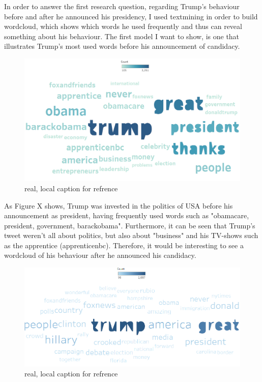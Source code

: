 \documentclass{article}
\begin{document}
In order to answer the first research question, regarding Trump's behaviour before and after he announced his presidency, I used textmining in order to build wordcloud, which shows which words he used frequently and thus can reveal something about his behaviour. The first model I want to show, is one that illustrates Trump's most used words before his announcement of candidacy.


\begin{figure}[H] %
	\centering %
\includegraphics [scale= .45]  {TrumpBeforeAnnouncementWordFinal}    %
	\caption[Optional caption] {real, local caption for refrence}
	\label{fig:wordcloudBliz}

\end{figure}

As Figure X shows, Trump was invested in the politics of USA before his announcement as president, having frequently used words such as "obamacare, president, government, barackobama". Furthermore, it can be seen that Trump's tweet weren't all about politics, but also about "business" and his TV-shows such as the apprentice (apprenticenbc). Therefore, it would be interesting to see a wordcloud of his behaviour after he announced his candidacy. 


\begin{figure}[H] %
	\centering %
\includegraphics [scale= .45]  {TrumpAfterAnnouncement}    %
	\caption[Optional caption] {real, local caption for refrence}
	\label{fig:wordcloudBliz}

\end{figure}
\end{document}
